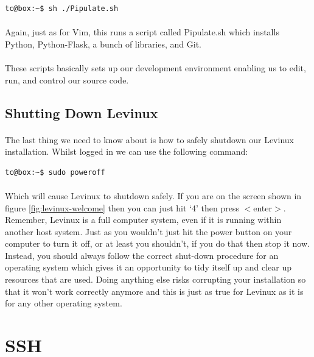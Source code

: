 \documentclass[12pt, a4paper, twoside]{book}
\begin{document}
\begin{lstlisting}[style=DOS]
    tc@box:~$ sh ./Pipulate.sh 
\end{lstlisting}
\paragraph{} Again, just as for Vim, this runs a script called Pipulate.sh which installs Python, Python-Flask, a bunch of libraries, and Git. 

\paragraph{} These scripts basically sets up our development environment enabling us to edit, run, and control our source code.

\subsection{Shutting Down Levinux}
\paragraph{} The last thing we need to know about is how to safely shutdown our Levinux installation. Whilst logged in we can use the following command:
\begin{lstlisting}[style=DOS]
    tc@box:~$ sudo poweroff
\end{lstlisting}
\paragraph{} Which will cause Levinux to shutdown safely. If you are on the screen shown in figure \ref{fig:levinux-welcome} then you can just hit `4' then press $<$enter$>$. Remember, Levinux is a full computer system, even if it is running within another host system. Just as you wouldn't just hit the power button on your computer to turn it off, or at least you shouldn't, if you do that then stop it now. Instead, you should always follow the correct shut-down procedure for an operating system which gives it an opportunity to tidy itself up and clear up resources that are used. Doing anything else risks corrupting your installation so that it won't work correctly anymore and this is just as true for Levinux as it is for any other operating system.



\section{SSH}
\label{ssh}
\end{document}
